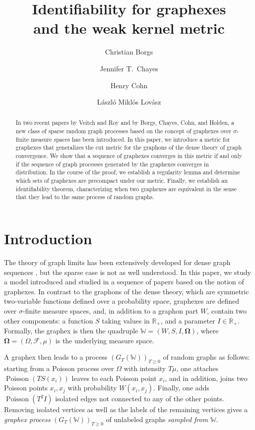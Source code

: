 \documentclass{amsart}
\title[Identifiability for graphexes and the weak kernel metric ]
{Identifiability for graphexes\\ and the weak kernel metric }
\author[Borgs]{Christian Borgs}
\author[Chayes]{Jennifer T.\ Chayes}
\author[Cohn]{Henry Cohn}
\author[Lov\'asz]{L\'aszl\'o Mikl\'os Lov\'asz}
\numberwithin{equation}{section}
\numberwithin{figure}{section}
\theoremstyle{definition}
\theoremstyle{remark}
\DeclareMathOperator{\Poisson}{Poisson}
\newcommand{\bOmega}{{\mathbf{\Omega}}}
\newcommand{\RR}{\mathbb{R}}
\newcommand{\cW}{\mathbb{W}}
\newcommand{\cF}{\mathcal{F}}
\begin{document}
\begin{abstract}
In two recent papers by Veitch and Roy and by Borgs, Chayes, Cohn, and
Holden, a new class of sparse random graph processes based on the concept
of graphexes over $\sigma$-finite measure spaces has been introduced. In
this paper, we introduce a metric for graphexes that generalizes the cut
metric for the graphons of the dense theory of graph convergence. We show
that a sequence of graphexes converges in this metric if and only if the
sequence of graph processes generated by the graphexes converges in
distribution. In the course of the proof, we establish a regularity lemma
and determine which sets of graphexes are precompact under our metric.
Finally, we establish an identifiability theorem, characterizing when two
graphexes are equivalent in the sense that they lead to the same process of
random graphs.
\end{abstract}

\maketitle

\tableofcontents

\section{Introduction} \label{sec:intro}

The theory of graph limits has been extensively developed for dense graph
sequences \cite{BCLSV06,ls-graphlimits,ls-analyst,BCLSV08,BCL10,BCLSV12}, but
the sparse case is not as well understood. In this paper, we study a model
introduced and studied in a sequence of papers
\cite{caron-fox,VR15,BCCH16,JANSON16,VR16,JANSON17,BCCV17} based on the
notion of graphexes. In contrast to the graphons of the dense theory, which
are symmetric two-variable functions defined over a probability space,
graphexes are defined over $\sigma$-finite measure spaces, and, in addition
to a graphon part $W$, contain two other components: a function $S$ taking
values in $\RR_+$, and a parameter $I\in \RR_+$. Formally, the graphex is
then the quadruple $\cW=(W,S,I,\bOmega)$, where $\bOmega=(\Omega,\cF,\mu)$ is
the underlying measure space.

A graphex then leads to a process $(G_T(\cW))_{T\geq 0}$ of random graphs as
follows: starting from a Poisson process over $\Omega$ with intensity $T\mu$,
one attaches $\Poisson(TS(x_i))$ leaves to each Poisson point $x_i$, and in
addition, joins two Poisson points $x_i,x_j$ with probability $W(x_i,x_j)$.
Finally, one adds $\Poisson(T^2I)$ isolated edges not connected to any of the
other points. Removing isolated vertices as well as the labels of the
remaining vertices gives a \emph{graphex process} $(G_T(\cW))_{T\geq 0}$ of
unlabeled graphs \emph{sampled from $\cW$}.
\end{document}
